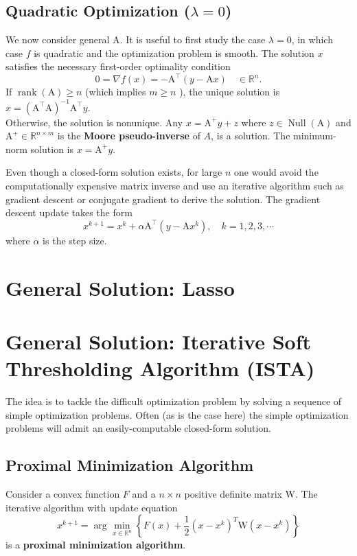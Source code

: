 \documentclass[11pt]{elegantbook}
\begin{document}
\subsection{Quadratic Optimization ($\lambda=0$)}
We now consider general A. It is useful to first study the case $\lambda=0$, in which case $f$ is quadratic and the optimization problem is smooth. The solution $x$ satisfies the necessary first-order optimality condition
$$
0=\nabla f(x)=-\mathrm{A}^{\top}(y-\mathrm{A} x) \quad \in \mathbb{R}^n .
$$
If $\operatorname{rank}(\mathrm{A}) \geq n$ (which implies $m \geq n$ ), the unique solution is $x=\left(\mathrm{A}^{\top} \mathrm{A}\right)^{-1} \mathrm{A}^{\top} y$.\\
Otherwise, the solution is nonunique. Any $x=\mathrm{A}^{+} y+z$ where $z \in \operatorname{Null}(\mathrm{A})$ and $\mathrm{A}^{+} \in \mathbb{R}^{n \times m}$ is the \textbf{Moore pseudo-inverse} of $A$, is a solution. The minimum-norm solution is $x=\mathrm{A}^{+} y$.

Even though a closed-form solution exists, for large $n$ one would avoid the computationally expensive matrix inverse and use an iterative algorithm such as gradient descent or conjugate gradient to derive the solution. The gradient descent update takes the form
$$
x^{k+1}=x^k+\alpha \mathrm{A}^{\top}\left(y-\mathrm{A} x^k\right), \quad k=1,2,3, \cdots
$$
where $\alpha$ is the step size.

\section{General Solution: Lasso}

\section{General Solution: Iterative Soft Thresholding Algorithm (ISTA)}
The idea is to tackle the difficult optimization problem by solving a sequence of simple optimization problems. Often (as is the case here) the simple optimization problems will admit an easily-computable closed-form solution.

\subsection{Proximal Minimization Algorithm}
\begin{definition}
    Consider a convex function $F$ and a $n \times n$ positive definite matrix W. The iterative algorithm with update equation
    $$
    x^{k+1}=\arg \min _{x \in \mathbb{R}^n}\left\{F(x)+\frac{1}{2}\left(x-x^k\right)^T \mathrm{W}\left(x-x^k\right)\right\}
    $$
    is a \textbf{proximal minimization algorithm}.
\end{definition}
\end{document}
